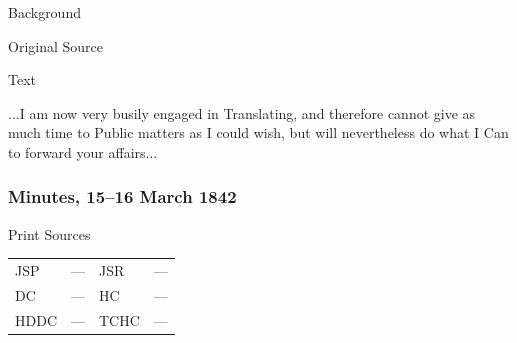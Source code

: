 			\begin{description}
				\item[Background]
			\end{description}
			
			
			\begin{description}
				\item[Original Source]
			\end{description}
			
			
			\begin{description}
				\item[Text]
			\end{description}
			
				...I am now very busily engaged in Translating, and therefore cannot give as much time to Public matters as I could wish, but will nevertheless do what I Can to forward your affairs...
				
		\subsubsection{Minutes, 15--16 March 1842}
			\label{EMS-1842-JS-15-16-MAR-1842}
			
			\begin{description}
				\item[Print Sources]
			\end{description}

			\begin{tabular}{p{0.5in}p{1in}p{0.5in}p{1in}}
				JSP	 	& ---		& JSR 		& --- \\
				DC	 	& ---		& HC 		& --- \\
				HDDC 	& ---		& TCHC 		& --- \\
			\end{tabular}
			
